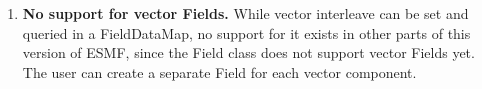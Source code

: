 

\begin{enumerate}

\item {\bf No support for vector Fields.} While vector interleave 
can be set and queried
in a FieldDataMap, no support for it exists in other
parts of this version of ESMF, since the Field class does not
support vector Fields yet.  The user can create a separate 
Field for each vector component.

\end{enumerate}


